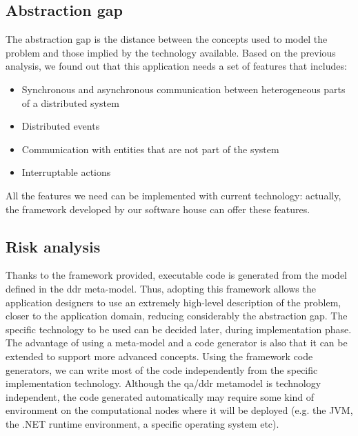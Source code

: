 \documentclass{llncs}
\begin{document}
\subsection{Abstraction gap}
The abstraction gap is the distance between the concepts used to model the problem and those implied by the technology available.
Based on the previous analysis, we found out that this application needs a set of features that includes:
\begin{itemize}
\item Synchronous and asynchronous communication between heterogeneous parts of a distributed system
\item Distributed events
\item Communication with entities that are not part of the system
\item Interruptable actions
\end{itemize}
All the features we need can be implemented with current technology: actually, the framework developed by our software house can offer these features.
\subsection{Risk analysis}
Thanks to the framework provided, executable code is generated from the model defined in the ddr meta-model. Thus, adopting this framework allows the application designers to use an extremely high-level description of the problem, closer to the application domain, reducing considerably the abstraction gap. The specific technology to be used can be decided later, during implementation phase. The advantage of using a meta-model and a code generator is also that it can be extended to support more advanced concepts.
Using the framework code generators, we can write most of the code independently from the specific implementation technology. Although the qa/ddr metamodel is technology independent, the code generated automatically may require some kind of environment on the computational nodes where it will be deployed (e.g. the JVM, the .NET runtime environment, a specific operating system etc).
\end{document}
